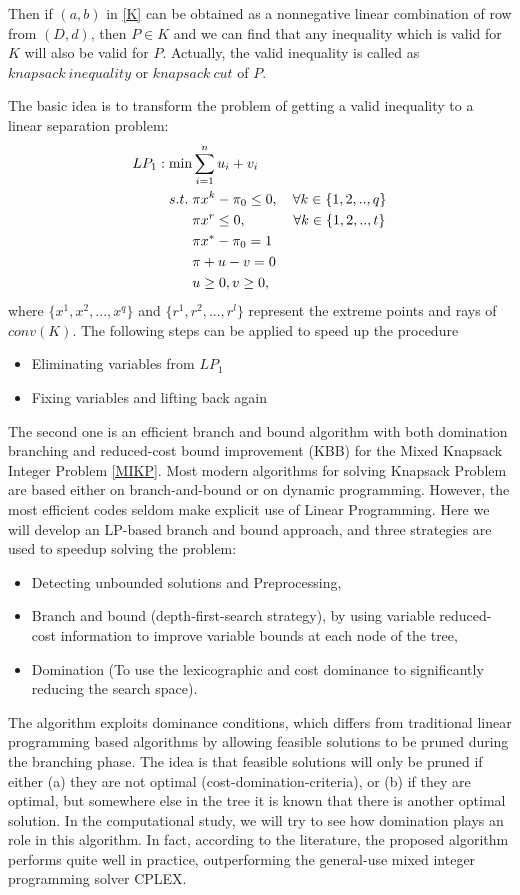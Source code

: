 \documentclass[a4paper,11pt]{article}
\begin{document}
Then if $(a,b)$ in \eqref{K} can be obtained as a nonnegative linear combination of row from $(D,d)$, then $P\in K$ and we can find that any inequality
 which is valid for  $K$ will also be valid for $P$. Actually, the valid inequality is called as $knapsack~inequality$ or $knapsack~cut$ of $P$.
 
The basic idea is to transform the problem of getting a valid inequality to a linear separation problem:
\begin{align}
LP_1: \min &\sum_{i=1}^{n} u_i+v_i \notag\\
s.t. \;  & \pi x^k-\pi_0\leq 0,  \quad \forall k\in\{1,2,..,q\} \notag\\
& \pi x^r\leq 0, \quad~ \qquad \forall  k\in\{1,2,..,t\} \notag\\
& \pi x^*-\pi_0 = 1 \notag\\
& \pi+u-v = 0 \notag\\
&u\geq 0, v\geq 0\notag,
\end{align}
where $\{x^1, x^2,...,x^q\}$ and $\{r^1,r^2,..., r^l\}$ represent the extreme points and rays of $conv(K)$. The following steps can be applied to speed up the procedure
\begin{itemize}
 \item Eliminating variables from $LP_1$
 \item Fixing variables and lifting back again
\end{itemize}

The second one is an efficient branch and bound algorithm with both domination branching and reduced-cost bound improvement (KBB) for the Mixed 
Knapsack Integer Problem \eqref{MIKP}. Most modern algorithms for solving Knapsack Problem are based either on branch-and-bound or on dynamic 
programming. However, the most efficient codes seldom make explicit use of Linear Programming. Here we will develop an LP-based branch and bound 
approach, and three strategies are used to speedup solving the problem:
\begin{itemize}
 \item Detecting unbounded solutions and Preprocessing,
 \item Branch and bound (depth-first-search strategy), by using variable reduced-cost information to improve variable bounds at each node of the tree,
 \item Domination (To use the lexicographic and cost dominance to significantly reducing the search space). 
\end{itemize}

The algorithm exploits dominance conditions, which differs from traditional linear programming based algorithms by allowing feasible 
solutions to be pruned during the branching phase. The idea is that feasible solutions will only be pruned if either (a) they are not 
optimal (cost-domination-criteria), or (b) if they are optimal, but somewhere else in the tree it is known that there is another optimal 
solution. In the computational study, we will try to see how  domination plays an role in this algorithm. In fact, according to the literature, the 
proposed algorithm performs quite well in practice, outperforming the general-use mixed integer programming solver CPLEX. 
\end{document}
